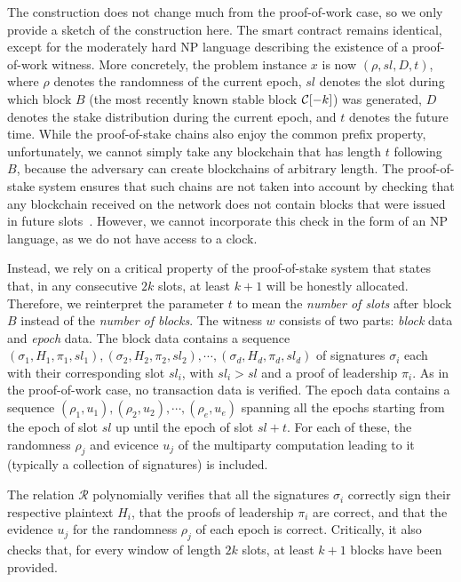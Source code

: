 The construction does not change much from the proof-of-work case, so we only provide a sketch
of the construction here. The smart contract remains identical, except
for the moderately hard \textsc{NP} language describing the existence of a proof-of-work witness.
More concretely, the problem instance $x$ is now $(\rho, sl, D, t)$, where $\rho$ denotes the randomness
of the current epoch, $sl$ denotes the
slot during which block $B$ (the most recently known stable block $\mathcal{C}[-k]$) was generated,
$D$ denotes the stake distribution during the current epoch, and $t$ denotes
the future time.
While the proof-of-stake chains also enjoy the common prefix property,
unfortunately, we cannot simply take any blockchain that has length $t$ following $B$,
because the adversary can create blockchains of arbitrary length. The proof-of-stake system
ensures that such chains are not taken into account by checking that any blockchain
received on the network does not contain blocks that were issued in future slots~\cite{ouroboros}.
However, we cannot incorporate this check in the form of an \textsc{NP} language, as
we do not have access to a clock.

Instead, we rely on a critical property of the proof-of-stake system that states that,
in any consecutive $2k$ slots, at least $k+1$ will be honestly allocated.
Therefore, we reinterpret the parameter $t$ to mean the \emph{number of slots} after
block $B$ instead of the \emph{number of blocks}. The witness $w$ consists
of two parts: \emph{block} data and \emph{epoch} data.
The block data contains a sequence
$(\sigma_1, H_1, \pi_1, sl_1),\allowbreak (\sigma_2, H_2, \pi_2, sl_2),\allowbreak
 \cdots,\allowbreak (\sigma_d, H_d, \pi_d, sl_d)$
of signatures
$\sigma_i$ each with their corresponding slot $sl_i$, with $sl_i > sl$ and
a proof of leadership $\pi_i$. As in the proof-of-work case, no transaction data is verified.
The epoch data contains a sequence
$(\rho_1, u_1),\allowbreak (\rho_2, u_2),\allowbreak \cdots,\allowbreak (\rho_e, u_e)$
spanning all the epochs starting from the epoch of slot $sl$ up until the epoch
of slot $sl + t$. For each of these, the randomness $\rho_j$ and evicence $u_j$ of the multiparty
computation leading to it (typically a collection of signatures) is included.

The relation $\mathcal{R}$ polynomially verifies that all the signatures $\sigma_i$
correctly sign their respective plaintext $H_i$, that
the proofs of leadership $\pi_i$ are correct, and that the evidence $u_j$ for the
randomness $\rho_j$ of each epoch is correct.
Critically, it also checks that, for every window of length $2k$ slots, at least
$k+1$ blocks have been provided.

